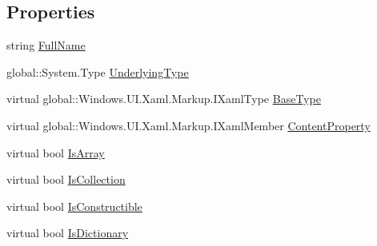 \subsection*{Properties}
\begin{DoxyCompactItemize}
\item 
string \hyperlink{class_eli_log_in_app_1_1_eli_log_in_app___xaml_type_info_1_1_xaml_system_base_type_a6097ab13d56f78d1a49f8e00979d3c1d}{Full\+Name}
\item 
global\+::\+System.\+Type \hyperlink{class_eli_log_in_app_1_1_eli_log_in_app___xaml_type_info_1_1_xaml_system_base_type_ad49b42450dc68ac2bb46f1003fed655d}{Underlying\+Type}
\item 
virtual global\+::\+Windows.\+U\+I.\+Xaml.\+Markup.\+I\+Xaml\+Type \hyperlink{class_eli_log_in_app_1_1_eli_log_in_app___xaml_type_info_1_1_xaml_system_base_type_a5b911d6b142a326016f9a895a536bca6}{Base\+Type}
\item 
virtual global\+::\+Windows.\+U\+I.\+Xaml.\+Markup.\+I\+Xaml\+Member \hyperlink{class_eli_log_in_app_1_1_eli_log_in_app___xaml_type_info_1_1_xaml_system_base_type_a50fcaccc17d1abbacaee7ef0dff078f5}{Content\+Property}
\item 
virtual bool \hyperlink{class_eli_log_in_app_1_1_eli_log_in_app___xaml_type_info_1_1_xaml_system_base_type_aa74f67b6b0345e63571e08e831a1cbcd}{Is\+Array}
\item 
virtual bool \hyperlink{class_eli_log_in_app_1_1_eli_log_in_app___xaml_type_info_1_1_xaml_system_base_type_a939f6d936fbc3f2ddaaea3343088c145}{Is\+Collection}
\item 
virtual bool \hyperlink{class_eli_log_in_app_1_1_eli_log_in_app___xaml_type_info_1_1_xaml_system_base_type_ace333d997dfca2d94d98e646bd161d85}{Is\+Constructible}
\item 
virtual bool \hyperlink{class_eli_log_in_app_1_1_eli_log_in_app___xaml_type_info_1_1_xaml_system_base_type_ac1f9a062a434e21b2fc1256b594d78e2}{Is\+Dictionary}

\end{DoxyCompactItemize}
